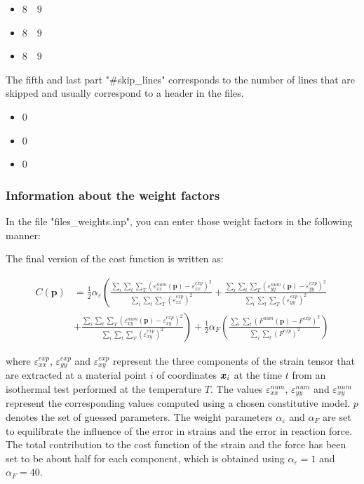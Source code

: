 \begin{itemize}
\item $8 \quad 9$
\item $8 \quad 9$
\item $8 \quad 9$
\end{itemize}

The fifth and last part  "\#skip\_lines" corresponds to the number of lines that are skipped and usually correspond to a header in the files.

\begin{itemize}
\item $0$
\item $0$
\item $0$
\end{itemize}

\subsubsection{Information about the weight factors}

In the file "files\_weights.inp", you can enter those weight factors in the following manner:



The final version of the cost function is written as:


\begin{equation}
\begin{split}
C(\mathbf{p}) & = \frac{1}{2} \alpha_{\varepsilon} \left( \frac{ \sum_i \sum_t \sum_T \left( \varepsilon_{xx}^{num}(\mathbf{p}) - \varepsilon_{xx}^{exp} \right)^2 }{ \sum_i \sum_t \sum_T \left( \varepsilon_{xx}^{exp} \right)^2 } 
 +  \frac{ \sum_i \sum_t \sum_T \left( \varepsilon_{yy}^{num}(\mathbf{p}) - \varepsilon_{yy}^{exp} \right)^2 }{ \sum_i \sum_t \sum_T \left( \varepsilon_{yy}^{exp} \right)^2 } \right. \\
& + \left.  \frac{ \sum_i \sum_t \sum_T \left( \varepsilon_{xy}^{num}(\mathbf{p}) - \varepsilon_{xy}^{exp} \right)^2 }{ \sum_i \sum_t \sum_T \left( \varepsilon_{xy}^{exp} \right)^2 } \right)
 + \frac{1}{2} \alpha_{F} \left( \frac{ \sum_i \sum_t \left( F^{num}(\mathbf{p}) - F^{exp} \right)^2 }{ \sum_i \sum_t \left( F^{exp} \right)^2 } \right)
\end{split}
\end{equation}

\noindent where $\varepsilon^{exp}_{xx}$, $\varepsilon^{exp}_{yy}$ and $\varepsilon^{exp}_{xy}$ represent the three components of  the strain tensor that are extracted at a material point $i$ of coordinates $\boldsymbol{x}_i$ at the time $t$ from an isothermal test performed at the temperature $T$. The values $\varepsilon^{num}_{xx}$, $\varepsilon^{num}_{yy}$ and $\varepsilon^{num}_{xy}$ represent the corresponding values computed using a chosen constitutive model. $p$ denotes the set of guessed parameters. The weight parameters $\alpha_{\varepsilon}$ and $\alpha_{F}$ are set to equilibrate the influence of the error in strains and the error in reaction force. The total contribution to the cost function of the strain and the force has been set to be about half for each component, which is obtained using $\alpha_{\varepsilon} = 1$ and $\alpha_{F} = 40$.

